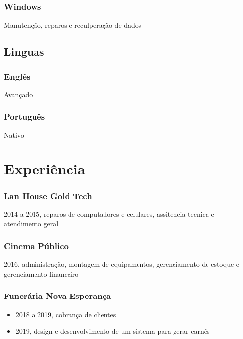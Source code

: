 \documentclass[11pt]{article}
\begin{document}
\subsubsection{Windows}
\label{sec:orgfc51968}
Manutenção, reparos e reculperação de dados
\subsection{Linguas}
\label{sec:orgeb10fd5}
\subsubsection{Englês}
\label{sec:orgde68fca}
Avançado
\subsubsection{Português}
\label{sec:org5584ce3}
Nativo

\section{Experiência}
\label{sec:orgdaaf3d3}
\subsubsection{Lan House Gold Tech}
\label{sec:org771c2fd}
2014 a 2015, reparos de computadores e celulares, assitencia tecnica e atendimento geral
\subsubsection{Cinema Público}
\label{sec:orgf1e26b3}
2016, administração, montagem de equipamentos, gerenciamento de estoque e gerenciamento financeiro
\subsubsection{Funerária Nova Esperança}
\label{sec:org6a9324d}
\begin{itemize}
\item 2018 a 2019, cobrança de clientes
\item 2019, design e desenvolvimento de um sistema para gerar carnês
\end{itemize}
\end{document}
